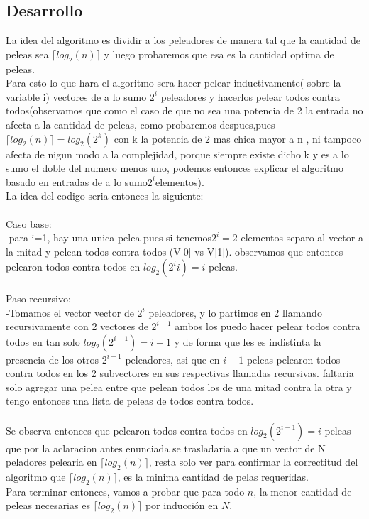    \subsection{Desarrollo}
	La idea del algoritmo es dividir a los peleadores de manera tal que la cantidad de peleas sea $\lceil log_{2}(n) \rceil$ y luego probaremos que esa es la cantidad optima de peleas.\\
   Para esto lo que hara el algoritmo sera hacer pelear inductivamente( sobre la variable i) vectores de a lo sumo $2^{i}$ peleadores y hacerlos pelear todos contra todos(observamos que como el caso de que no sea una potencia de 2 la entrada no afecta a la cantidad de peleas, como probaremos despues,pues $\lceil log_{2}(n) \rceil=log_{2}(2^k)$ con k la potencia de 2 mas chica mayor a n , ni tampoco afecta de nigun modo a la complejidad, porque siempre existe dicho k y es  a lo sumo el doble del numero menos uno, podemos entonces  explicar el algoritmo basado en entradas de a lo sumo$2^{i}$elementos).\\
  La idea del codigo seria entonces la siguiente:\\
  \\
Caso base:\\
   -para i=1, hay una unica pelea pues si tenemos$2^{i}=2$ elementos separo al vector a la mitad y pelean todos contra todos (V[0] vs V[1]).
   observamos que entonces pelearon todos contra todos en $log_2(2^{i}i)=i$ peleas.\\
   \\
Paso recursivo:\\
  -Tomamos el vector vector de $2^{i}$ peleadores, y lo partimos en 2 llamando recursivamente con 2 vectores de $2^{i-1}$ ambos los puedo hacer pelear todos contra todos en tan solo $log_2(2^{i-1})=i-1$ y  de forma que les es indistinta la presencia de los otros $2^{i-1}$ peleadores, asi que en $i-1$ peleas pelearon todos contra todos en los 2 subvectores en sus respectivas llamadas recursivas. faltaria solo agregar una pelea entre que pelean todos los de una mitad contra la otra y tengo entonces una lista de peleas de todos contra todos.
\\
\\
Se observa entonces que pelearon todos contra todos en $log_2(2^{i-1})=i$ peleas que por la aclaracion antes enunciada se trasladaria a que un vector de N peladores pelearia en $\lceil log_{2}(n) \rceil$, resta solo ver para confirmar la correctitud del algoritmo que $\lceil log_{2}(n) \rceil$, es la minima cantidad de pelas requeridas.
\\
Para terminar entonces, vamos a probar que para todo $n$, la menor cantidad de peleas necesarias es $\lceil log_{2}(n) \rceil$ por inducción en $N$.

